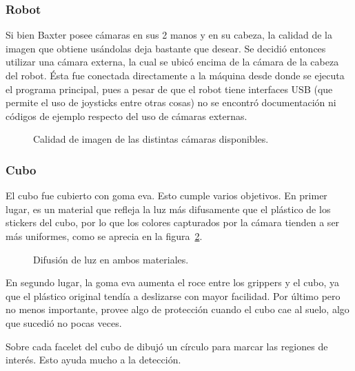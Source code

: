 \subsubsection{Robot}
Si bien Baxter posee cámaras en sus 2 manos y en su cabeza, la calidad de la imagen que obtiene usándolas deja bastante que desear. Se decidió entonces utilizar una cámara externa, la cual se ubicó encima de la cámara de la cabeza del robot. Ésta fue conectada directamente a la máquina desde donde se ejecuta el programa principal, pues a pesar de que el robot tiene interfaces USB (que permite el uso de joysticks entre otras cosas) no se encontró documentación ni códigos de ejemplo respecto del uso de cámaras externas.
\begin{figure}[h!]
	\centering
	\hfill
	\hfill
	\hfill
	\caption{Calidad de imagen de las distintas cámaras disponibles.}
	\label{camaras}
\end{figure}

\subsubsection{Cubo}
El cubo fue cubierto con goma eva. Esto cumple varios objetivos. En primer lugar, es un material que refleja la luz más difusamente que el plástico de los stickers del cubo, por lo que los colores capturados por la cámara tienden a ser más uniformes, como se aprecia en la figura~\ref{luz}.

\begin{figure}[h!]
	\centering
	\caption{Difusión de luz en ambos materiales.}
	\label{luz}
\end{figure}

En segundo lugar, la goma eva aumenta el roce entre los grippers y el cubo, ya que el plástico original tendía a deslizarse con mayor facilidad. Por último pero no menos importante, provee algo de protección cuando el cubo cae al suelo, algo que sucedió no pocas veces.

Sobre cada facelet del cubo de dibujó un círculo para marcar las regiones de interés. Esto ayuda mucho a la detección.

